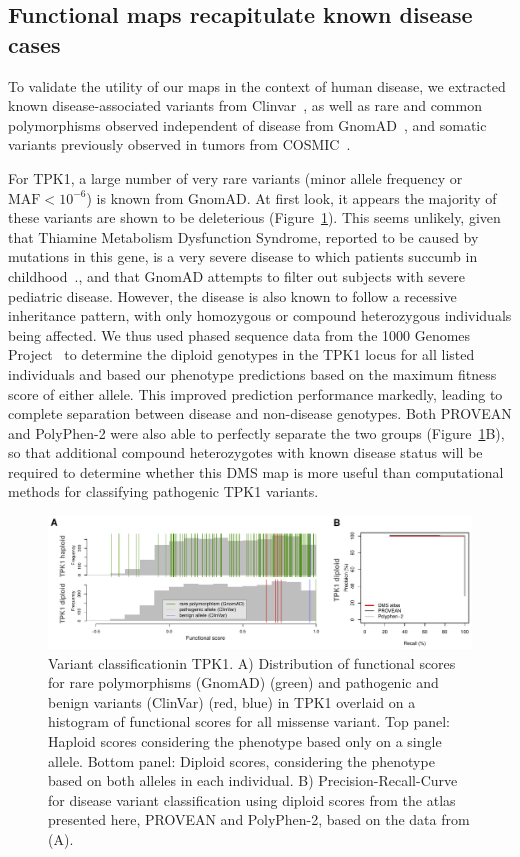 \subsection{Functional maps recapitulate known disease cases}

To validate the utility of our maps in the context of human disease, we extracted known disease-associated variants from Clinvar~\cite{landrum_clinvar:_2016}, as well as rare and common polymorphisms observed independent of disease from GnomAD~\cite{lek_analysis_2016}, and somatic variants previously observed in tumors from COSMIC~\cite{forbes_cosmic:_2001}. 

For TPK1, a large number of very rare variants (minor allele frequency or $\text{MAF} < 10^{-6}$) is known from GnomAD. At first look, it appears the majority of these variants are shown to be deleterious (Figure~\ref{fig:tpk1_diploid}). This seems unlikely, given that Thiamine Metabolism Dysfunction Syndrome, reported to be caused by mutations in this gene, is a very severe disease to which patients succumb in childhood~\cite{mayr_thiamine_2011}., and that GnomAD attempts to filter out subjects with severe pediatric disease. However, the disease is also known to follow a recessive inheritance pattern, with only homozygous or compound heterozygous individuals being affected. We thus used phased sequence data from the 1000 Genomes Project~\cite{the_1000_genomes_project_consortium_global_2015} to determine the diploid genotypes in the TPK1 locus for all listed individuals and based our phenotype predictions based on the maximum fitness score of either allele. This improved prediction performance markedly, leading to complete separation between disease and non-disease genotypes. Both PROVEAN and PolyPhen-2 were also able to perfectly separate the two groups (Figure~\ref{fig:tpk1_diploid}B), so that additional compound heterozygotes with known disease status will be required to determine whether this DMS map is more useful than computational methods for classifying pathogenic TPK1 variants. 

\begin{figure}[h!]
	\centering
	\includegraphics[width=\textwidth]{img/diploid.pdf}
	\caption{Variant classificationin TPK1. A) Distribution of functional scores for rare polymorphisms (GnomAD) (green) and pathogenic and benign variants (ClinVar) (red, blue) in TPK1 overlaid on a histogram of functional scores for all missense variant. Top panel: Haploid scores considering the phenotype based only on a single allele. Bottom panel: Diploid scores, considering the phenotype based on both alleles in each individual. B) Precision-Recall-Curve for disease variant classification using diploid scores from the atlas presented here, PROVEAN and PolyPhen-2, based on the data from (A).}
	\label{fig:tpk1_diploid}
\end{figure}


